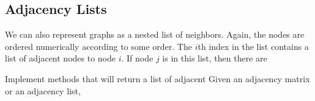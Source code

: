 \subsection*{Adjacency Lists}
We can also represent graphs as a nested list of neighbors.
Again, the nodes are ordered numerically according to some order.
The $i$th index in the list contains a list of adjacent nodes to node $i$.  If node $j$ is in this list, then there are 

\begin{problem}
Implement methods that will return a list of adjacent 
Given an adjacency matrix or an adjacency list, 
\end{problem}